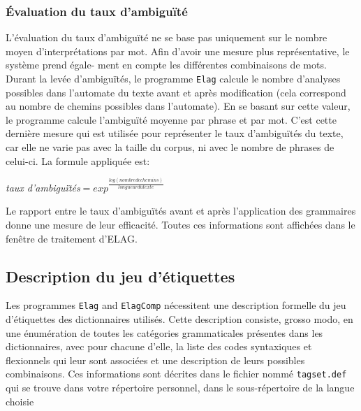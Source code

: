 \subsubsection{Évaluation du taux d’ambiguïté}
L’évaluation du taux d’ambiguïté ne se base pas uniquement sur le nombre moyen d’interprétations
par mot. Afin d’avoir une mesure plus représentative, le système prend égale-
ment en compte les différentes combinaisons de mots. Durant la levée d’ambiguïtés, le programme 
 \verb+Elag+ calcule le nombre d’analyses possibles dans l’automate du texte avant et après
 modification (cela correspond au nombre de chemins possibles dans l’automate). En se basant sur
 cette valeur, le programme calcule l’ambiguïté moyenne par phrase et par mot. C’est cette dernière
 mesure qui est utilisée pour représenter le taux d’ambiguïtés du texte, car elle ne varie pas avec
 la taille du corpus, ni avec le nombre de phrases de celui-ci. La formule appliquée est:



\bigskip
\begin{center}
	\textit{taux d’ambiguïtés}$=exp^{\frac{log(nombre de chemins)}{longueur du texte}}$
\end{center}

\bigskip \noindent Le rapport entre le taux d’ambiguïtés avant et après l’application des grammaires
donne une mesure de leur efficacité. Toutes ces informations sont affichées dans le fenêtre de
traitement d’ELAG.



\subsection{Description du jeu d’étiquettes}
\label{section-elag-tagset}

Les programmes \verb+Elag+ and \verb+ElagComp+  
 nécessitent une description formelle du jeu d’étiquettes
des dictionnaires utilisés. Cette description consiste, grosso modo, en une énumération de toutes
les catégories grammaticales présentes dans les dictionnaires, avec pour
chacune d’elle, la liste des codes syntaxiques et flexionnels qui leur sont associées et une
description de leurs possibles combinaisons. Ces informations sont décrites dans le fichier
nommé \verb$tagset.def$ qui se trouve dans votre répertoire personnel, dans le sous-répertoire de la langue choisie



